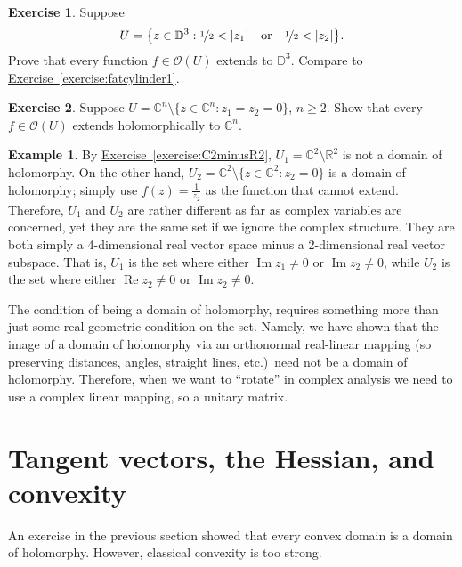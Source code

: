\documentclass[12pt,openany]{book}
\newcommand{\avoidbreak}{\postdisplaypenalty=100}
\renewcommand{\Re}{\operatorname{Re}}
\renewcommand{\Im}{\operatorname{Im}}
\newcommand{\sabs}[1]{\lvert {#1} \rvert}
\newcommand{\C}{{\mathbb{C}}}
\newcommand{\R}{{\mathbb{R}}}
\newcommand{\D}{{\mathbb{D}}}
\newcommand{\sO}{{\mathscr{O}}}
\theoremstyle{plain}
\theoremstyle{remark}
\theoremstyle{definition}
\newenvironment{exbox}{%
    \def\FrameCommand{\vrule width 1pt \relax\hspace{10pt}}%
    \MakeFramed{\advance\hsize-\width\FrameRestore}%
}{%
    \endMakeFramed
}
\theoremstyle{exercise}
\newtheorem{exercise}{Exercise}[section]
\theoremstyle{example}
\newtheorem{example}[thm]{Example}
\newcommand{\exerciseref}[1]{\hyperref[#1]{Exercise~\ref*{#1}}}
\begin{document}
\begin{exbox}
\begin{exercise} \label{exercise:fatcylinder2}
Suppose 
\begin{equation*}
U = \bigl\{ z \in \D^3 :
\nicefrac{1}{2} < \sabs{z_1} \quad\text{or}\quad
\nicefrac{1}{2} < \sabs{z_2} \bigr\} .
\avoidbreak
\end{equation*}
Prove that every function $f \in \sO(U)$ extends to $\D^3$.
Compare to \exerciseref{exercise:fatcylinder1}.
\end{exercise}

\begin{exercise} \label{exercise:codim2extends}
Suppose $U = \C^n \setminus \{ z \in \C^n : z_1 = z_2 = 0 \}$, $n
\geq 2$.  Show that every $f \in \sO(U)$ extends holomorphically to
$\C^n$.
\end{exercise}
\end{exbox}

\begin{example}
By
\exerciseref{exercise:C2minusR2},
$U_1 = \C^2 \setminus \R^2$
is not a domain of holomorphy.  On the other hand,
$U_2 = \C^2 \setminus \{ z \in \C^2 : z_2 = 0 \}$ is a domain of holomorphy;
simply
use $f(z) = \frac{1}{z_2}$ as the function that cannot extend.
Therefore, $U_1$ and $U_2$ are rather different as far as complex variables are
concerned, yet they are the same set if we ignore the complex structure.
They are both simply a 4-dimensional real vector space minus a 2-dimensional
real vector subspace.  That is, $U_1$ is the set
where either $\Im z_1 \not= 0$ or $\Im z_2 \not= 0$,
while $U_2$ is the set
where either $\Re z_2 \not= 0$ or $\Im z_2 \not= 0$.

The condition of being a domain of holomorphy,
requires something more than just some real geometric condition on the
set.  Namely, we have shown that the image of a domain of holomorphy
via an orthonormal
real-linear mapping 
(so preserving distances, angles, straight lines,
etc.)\ need not be a domain of holomorphy.  Therefore, when we want to
``rotate'' in complex analysis we need to use a complex linear mapping,
so a unitary matrix.
\end{example}


\section{Tangent vectors, the Hessian, and convexity}

An exercise in the previous section showed that every convex domain is a
domain of holomorphy.  However, classical convexity is too strong.
\end{document}
